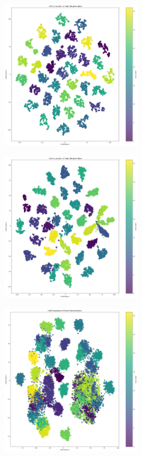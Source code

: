 \begin{multicols}{2}
\includegraphics[width=0.45\textwidth]{Assets/tSNE/EfficientNetB0.png}

\vspace{0.8cm}

\includegraphics[width=0.45\textwidth]{Assets/tSNE/EfficientNetV2L.png}

\vspace{0.8cm}

\newpage

\includegraphics[width=0.45\textwidth]{Assets/tSNE/MOBILENETV2.png}

\vspace{0.8cm}


\end{multicols}
